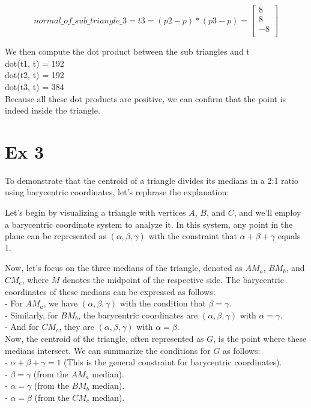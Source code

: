 \documentclass{article}
\begin{document}
\[
    normal\_of\_sub\_triangle\_3 = t3 = (p2 - p) * (p3 - p) =
    \begin{bmatrix}
        8  \\
        8  \\
        -8 \\
    \end{bmatrix}
\]




We then compute the dot product between the sub triangles and t
\\
dot(t1, t) = 192 \\
dot(t2, t) = 192 \\
dot(t3, t) = 384 \\
Because all these dot products are positive, we can confirm that the point is indeed inside the triangle.




\section*{Ex 3}



To demonstrate that the centroid of a triangle divides its medians in a 2:1 ratio using barycentric coordinates, let's rephrase the explanation:

Let's begin by visualizing a triangle with vertices $A$, $B$, and $C$, and we'll employ a barycentric coordinate system to analyze it. In this system, any point in the plane can be represented as $(\alpha, \beta, \gamma)$ with the constraint that $\alpha + \beta + \gamma$ equals 1.

Now, let's focus on the three medians of the triangle, denoted as $AM_a$, $BM_b$, and $CM_c$, where $M$ denotes the midpoint of the respective side. The barycentric coordinates of these medians can be expressed as follows:
\\
- For $AM_a$, we have $(\alpha, \beta, \gamma)$ with the condition that $\beta = \gamma$. \\
- Similarly, for $BM_b$, the barycentric coordinates are $(\alpha, \beta, \gamma)$ with $\alpha = \gamma$. \\
- And for $CM_c$, they are $(\alpha, \beta, \gamma)$ with $\alpha = \beta$. \\

Now, the centroid of the triangle, often represented as $G$, is the point where these medians intersect. We can summarize the conditions for $G$ as follows:
\\
- $\alpha + \beta + \gamma = 1$ (This is the general constraint for barycentric coordinates). \\
- $\beta = \gamma$ (from the $AM_a$ median). \\
- $\alpha = \gamma$ (from the $BM_b$ median). \\
- $\alpha = \beta$ (from the $CM_c$ median). \\
\end{document}
